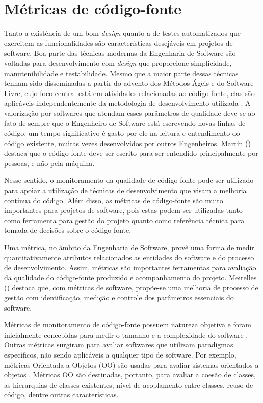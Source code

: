 \chapter{Métricas de código-fonte}
\label{cap-metrics-esw} 


Tanto a existência de um bom \emph{design} quanto a de testes automatizados que exercitem as funcionalidades são características desejáveis em projetos de software. Boa parte das técnicas modernas da Engenharia de Software são voltadas para desenvolvimento com \emph{design} que proporcione simplicidade, manutenibilidade e testabilidade. Mesmo que a maior parte dessas técnicas tenham sido disseminadas a partir do advento dos Métodos Ágeis e do Software Livre, cujo foco central está em atividades relacionadas ao código-fonte, elas são aplicáveis independentemente da metodologia de desenvolvimento utilizada \cite{meirelles2013metrics}. A valorização por softwares que atendam esses parâmetros de qualidade deve-se ao fato de sempre que o Engenheiro de Software está escrevendo novas linhas de código, um tempo significativo é gasto por ele na leitura e entendimento do código existente, muitas vezes desenvolvidos por outros Engenheiros. Martin (\citeyear{martin2008}) destaca que o código-fonte deve ser escrito para ser entendido principalmente por pessoas, e não pela máquina.

%

Nesse sentido, o monitoramento da qualidade de código-fonte pode ser utilizado para apoiar a utilização de técnicas de desenvolvimento que visam a melhoria contínua do código. Além disso, as métricas de código-fonte são muito importantes para projetos de software, pois estas podem ser utilizadas tanto como ferramenta para gestão do projeto quanto como referência técnica para tomada de decisões sobre o código-fonte.

%

Uma métrica, no âmbito da Engenharia de Software, provê uma forma de medir quantitativamente atributos relacionados as entidades do software e do processo de desenvolvimento. Assim, métricas são importantes ferramentas para avaliação da qualidade do código-fonte produzido e acompanhamento do projeto. Meirelles (\citeyear{meirelles2013metrics}) destaca que, com métricas de software, propõe-se uma melhoria de processo de gestão com identificação, medição e controle dos parâmetros essenciais do software.

%

Métricas de monitoramento de código-fonte possuem natureza objetiva e foram inicialmente concebidas para medir o tamanho e a complexidade do software \cite{henry1984kafura}\cite{troy1981zweben}\cite{yau1985zweben}. Outras métricas surgiram para avaliar softwares que utilizam paradigmas específicos, não sendo aplicáveis a qualquer tipo de software. Por exemplo, métricas Orientada a Objetos (OO) são usadas para avaliar sistemas orientados a objetos \cite{systa2000}. Métricas OO são destinadas, portanto, para avaliar a coesão de classes, as hierarquias de classes existentes, nível de acoplamento entre classes, reuso de código, dentre outras características.

